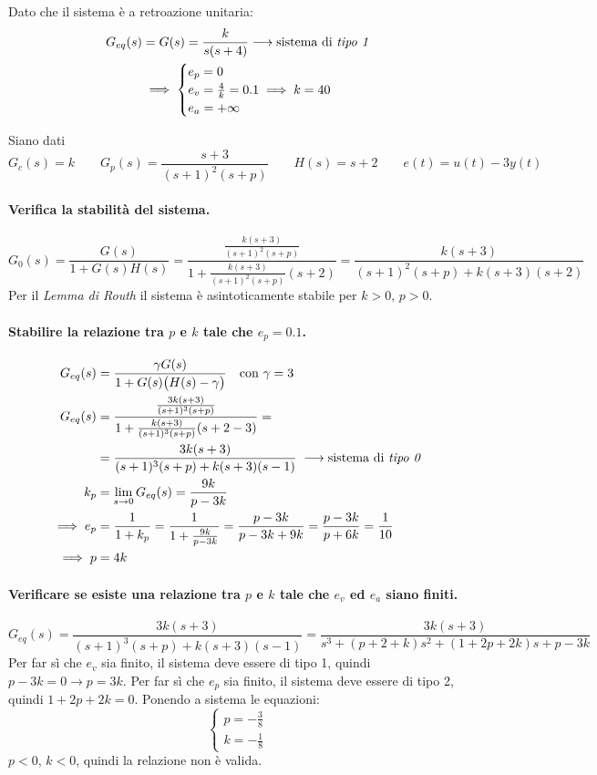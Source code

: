 Dato che il sistema è a retroazione unitaria:
\begin{align*}
	G_{eq}(s) &= G(s) = \frac{k}{s(s+4)} \longrightarrow \text{sistema di \emph{tipo 1}} \\
	&\implies \begin{cases}
		e_p = 0 \\
		e_v = \frac{4}{k} = 0.1 \implies k=40 \\
		e_a = +\infty
	\end{cases}
\end{align*}


\exercise{}
Siano dati
\[
	G_c(s) = k \qquad G_p(s) = \frac{s+3}{(s+1)^2(s+p)} \qquad
	H(s) = s+2 \qquad e(t) = u(t) -3y(t)
\]

\paragraph{Verifica la stabilità del sistema.}
\[
	G_0(s) = \frac{G(s)}{1+G(s)H(s)} =
		\frac{\frac{k(s+3)}{(s+1)^2(s+p)}}{1+\frac{k(s+3)}{(s+1)^2(s+p)}(s+2)} =
		\frac{k(s+3)}{(s+1)^2(s+p)+k(s+3)(s+2)}
\]
Per il \emph{Lemma di Routh} il sistema è asintoticamente stabile per \(k>0,\,p>0\).

\paragraph{Stabilire la relazione tra \(p\) e \(k\) tale che \(e_p = 0.1\).}
\begin{align*}
	G_{eq}(s) &= \frac{\gamma G(s)}{1+G(s) \bigl(H(s) - \gamma\bigr)} \quad
			\text{con } \gamma = 3 \\
	G_{eq}(s) &= \frac{\frac{3k(s+3)}{(s+1)^3(s+p)}}{1+\frac{k(s+3)}{(s+1)^3(s+p)}(s+2-3)} = \\
		  &= \frac{3k(s+3)}{(s+1)^3(s+p)+k(s+3)(s-1)} \;
			\longrightarrow \text{sistema di \emph{tipo 0}} \\
	k_p &= \lim_{s\to0} G_{eq}(s) = \frac{9k}{p-3k} \\
	\implies e_p &= \frac{1}{1+k_p} = \frac{1}{1+\frac{9k}{p-3k}} = \frac{p-3k}{p-3k+9k} = \frac{p-3k}{p+6k} = \frac{1}{10} \\
	\implies p &= 4k
\end{align*}

\paragraph{Verificare se esiste una relazione tra \(p\) e \(k\) tale che \(e_v\) ed \(e_a\) siano finiti.}
\[
	G_{eq}(s) = \frac{3k(s+3)}{(s+1)^3(s+p)+k(s+3)(s-1)} = \frac{3k(s+3)}{s^3 +(p+2+k)s^2 +(1+2p+2k)s +p-3k}
\]
Per far sì che \(e_v\) sia finito, il sistema deve essere di tipo 1, quindi \(p-3k=0 \rightarrow p = 3k\). Per far sì che \(e_p\) sia finito, il sistema deve essere di tipo 2, quindi \(1+2p+2k=0\). Ponendo a sistema le equazioni:
\[\begin{cases}
	p = -\frac{3}{8} \\
	k = -\frac{1}{8}
\end{cases}\]
\(p<0\), \(k<0\), quindi la relazione non è valida.


